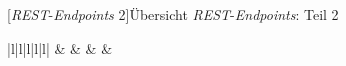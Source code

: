 [\textit{REST}-\textit{Endpoints} 2]{Übersicht \textit{REST}-\textit{Endpoints}: Teil 2}	
\label{table:endpoints2}
\begin{table}
	\centering
	\begin{tabular}{|l|l|l|l|l|}
		\hline
		 &                                                   &                                                                   &  &                                                                           \\ \hline
		

\end{tabular}
\end{table}
